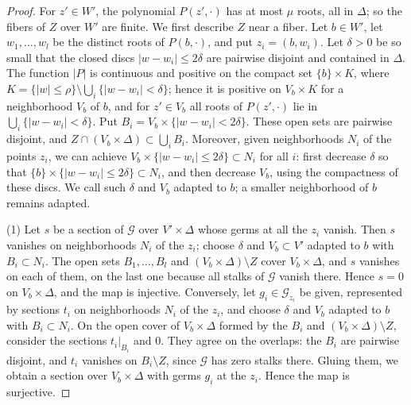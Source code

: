 \begin{proof}
For $z'\in W'$, the polynomial $P(z',\cdot)$ has at most $\mu$ roots, all in $\Delta$; so the fibers of $Z$ over $W'$ are finite. We first describe $Z$ near a fiber. Let $b\in W'$, let $w_1,\ldots,w_l$ be the distinct roots of $P(b,\cdot)$, and put $z_i=(b,w_i)$. Let $\delta>0$ be so small that the closed discs $|w-w_i|\leq2\delta$ are pairwise disjoint and contained in $\Delta$. The function $|P|$ is continuous and positive on the compact set $\{b\}\times K$, where $K=\{|w|\leq\rho\}\setminus\bigcup_i\{|w-w_i|<\delta\}$; hence it is positive on $V_b\times K$ for a neighborhood $V_b$ of $b$, and for $z'\in V_b$ all roots of $P(z',\cdot)$ lie in $\bigcup_i\{|w-w_i|<\delta\}$. Put $B_i=V_b\times\{|w-w_i|<2\delta\}$. These open sets are pairwise disjoint, and $Z\cap(V_b\times\Delta)\subset\bigcup_iB_i$. Moreover, given neighborhoods $N_i$ of the points $z_i$, we can achieve $V_b\times\{|w-w_i|\leq2\delta\}\subset N_i$ for all $i$: first decrease $\delta$ so that $\{b\}\times\{|w-w_i|\leq2\delta\}\subset N_i$, and then decrease $V_b$, using the compactness of these discs. We call such $\delta$ and $V_b$ adapted to $b$; a smaller neighborhood of $b$ remains adapted.

(1) Let $s$ be a section of $\mathcal G$ over $V'\times\Delta$ whose germs at all the $z_i$ vanish. Then $s$ vanishes on neighborhoods $N_i$ of the $z_i$; choose $\delta$ and $V_b\subset V'$ adapted to $b$ with $B_i\subset N_i$. The open sets $B_1,\ldots,B_l$ and $(V_b\times\Delta)\setminus Z$ cover $V_b\times\Delta$, and $s$ vanishes on each of them, on the last one because all stalks of $\mathcal G$ vanish there. Hence $s=0$ on $V_b\times\Delta$, and the map is injective. Conversely, let $g_i\in\mathcal G_{z_i}$ be given, represented by sections $t_i$ on neighborhoods $N_i$ of the $z_i$, and choose $\delta$ and $V_b$ adapted to $b$ with $B_i\subset N_i$. On the open cover of $V_b\times\Delta$ formed by the $B_i$ and $(V_b\times\Delta)\setminus Z$, consider the sections $t_i|_{B_i}$ and $0$. They agree on the overlaps: the $B_i$ are pairwise disjoint, and $t_i$ vanishes on $B_i\setminus Z$, since $\mathcal G$ has zero stalks there. Gluing them, we obtain a section over $V_b\times\Delta$ with germs $g_i$ at the $z_i$. Hence the map is surjective.


\end{proof}
